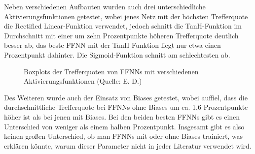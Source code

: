 \documentclass[a4paper,12pt,ngerman,oneside]{scrreprt}	%
\begin{document}
			Neben verschiedenen Aufbauten wurden auch drei unterschiedliche Aktivierungsfunktionen getestet, wobei jenes Netz mit der höchsten Trefferquote die Rectified Linear-Funktion verwendet, jedoch schnitt die TanH-Funktion im Durchschnitt mit einer um zehn Prozentpunkte höheren Trefferquote deutlich besser ab, das beste FFNN mit der TanH-Funktion liegt nur etwa einen Prozentpunkt dahinter. Die Sigmoid-Funktion schnitt am schlechtesten ab.  %
			
			\begin{figure}[h!]%
				\begin{scriptsize}
				\end{scriptsize}
				\vspace{-5mm}
				\caption{Boxplots der Trefferquoten von FFNNs mit verschiedenen Aktivierungsfunktionen (Quelle: E. D.)}
			\end{figure}

			Des Weiteren wurde auch der Einsatz von Biases getestet, wobei auffiel, dass die durchschnittliche Trefferquote bei FFNNs ohne Biases um ca. 1,6 Prozentpunkte höher ist als bei jenen mit Biases. Bei den beiden besten FFNNs gibt es einen Unterschied von weniger als einem halben Prozentpunkt. Insgesamt gibt es also keinen großen Unterschied, ob man FFNNs mit oder ohne Biases trainiert, was erklären könnte, warum dieser Parameter nicht in jeder Literatur verwendet wird. 
			
\end{document}
